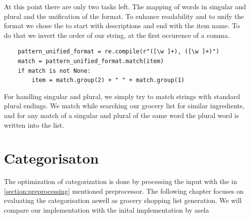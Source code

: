 At this point there are only two tasks left. The mapping of words in singular and plural and the unification of the format.
To enhance readability and to unify the format we chose the to start with descriptions and end with the item name. To do that we invert the order of our string, at the first occurence of a comma.
\begin{lstlisting}
	pattern_unified_format = re.compile(r"([\w ]+), ([\w ]+)")
    match = pattern_unified_format.match(item)
    if match is not None:
        item = match.group(2) + " " + match.group(1)
\end{lstlisting} 
For handling singular and plural, we simply try to match strings with standard plural endings. We match while searching our grocery list for similar ingredients, and for any match of a singular and plural of the same word the plural word is written into the list. 

\section{Categorisaton}\label{section:categorisation}
The optimization of categorization is done by processing the input with the in \ref{section:preprocessing} mentioned preprocessor. 
The following chapter focuses on evaluating the categorisation aswell as grocery shopping list generation. We will compare our implementation with the inital implementation by asela \

